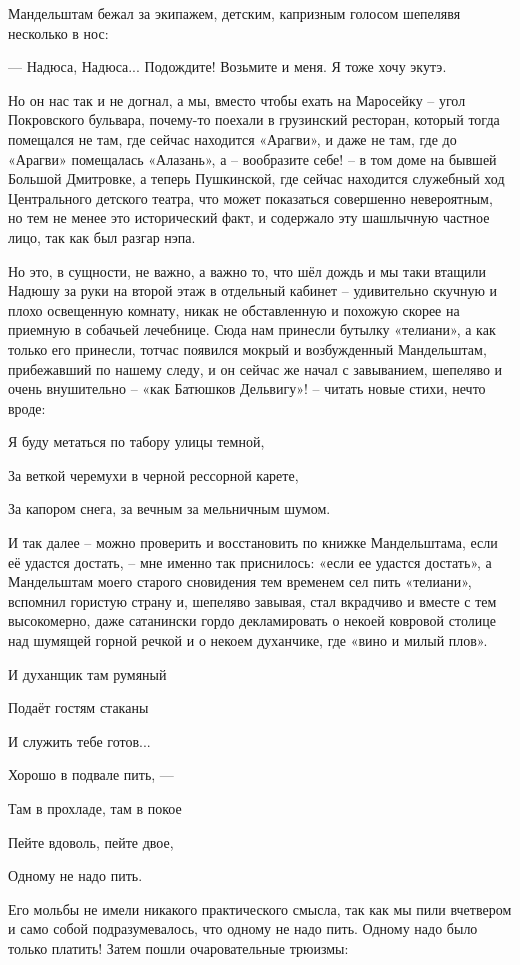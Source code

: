 \begin{itemize}
Мандельштам бежал за экипажем, детским, капризным голосом шепелявя несколько в
нос:

— Надюса, Надюса... Подождите! Возьмите и меня. Я тоже хочу экутэ.

Но он нас так и не догнал, а мы, вместо чтобы ехать на Маросейку – угол
Покровского бульвара, почему-то поехали в грузинский ресторан, который тогда
помещался не там, где сейчас находится «Арагви», и даже не там, где до «Арагви»
помещалась «Алазань», а – вообразите себе! – в том доме на бывшей Большой
Дмитровке, а теперь Пушкинской, где сейчас находится служебный ход Центрального
детского театра, что может показаться совершенно невероятным, но тем не менее
это исторический факт, и содержало эту шашлычную частное лицо, так как был
разгар нэпа.

Но это, в сущности, не важно, а важно то, что шёл дождь и мы таки втащили
Надюшу за руки на второй этаж в отдельный кабинет – удивительно скучную и плохо
освещенную комнату, никак не обставленную и похожую скорее на приемную в
собачьей лечебнице. Сюда нам принесли бутылку «телиани», а как только его
принесли, тотчас появился мокрый и возбужденный Мандельштам, прибежавший по
нашему следу, и он сейчас же начал с завыванием, шепеляво и очень внушительно –
«как Батюшков Дельвигу»! – читать новые стихи, нечто вроде:

Я буду метаться по табору улицы темной,

За веткой черемухи в черной рессорной карете,

За капором снега, за вечным за мельничным шумом.

И так далее – можно проверить и восстановить по книжке Мандельштама, если её
удастся достать, – мне именно так приснилось: «если ее удастся достать», а
Мандельштам моего старого сновидения тем временем сел пить «телиани», вспомнил
гористую страну и, шепеляво завывая, стал вкрадчиво и вместе с тем высокомерно,
даже сатанински гордо декламировать о некоей ковровой столице над шумящей
горной речкой и о некоем духанчике, где «вино и милый плов».

И духанщик там румяный

Подаёт гостям стаканы

И служить тебе готов...

Хорошо в подвале пить, —

Там в прохладе, там в покое

Пейте вдоволь, пейте двое,

Одному не надо пить.

Его мольбы не имели никакого практического смысла, так как мы пили вчетвером и
само собой подразумевалось, что одному не надо пить. Одному надо было только
платить! Затем пошли очаровательные трюизмы:


\end{itemize}
